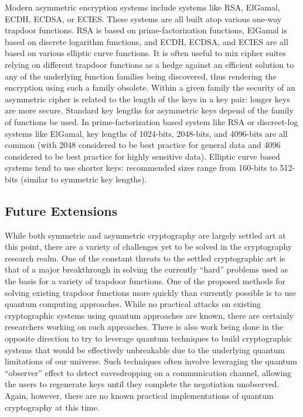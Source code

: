 \documentclass{sig-alternate}
\begin{document}
Modern asymmetric encryption systems include systems like RSA,
ElGamal, ECDH, ECDSA, or ECIES. These systems are all built atop
various one-way trapdoor functions. RSA is based on
prime-factorization functions, ElGamal is based on discrete logarithm
functions, and ECDH, ECDSA, and ECIES are all based on various
elliptic curve functions. It is often useful to mix cipher suites
relying on different trapdoor functions as a hedge against an
efficient solution to any of the underlying function families being
discovered, thus rendering the encryption using such a family
obsolete. Within a given family the security of an asymmetric cipher
is related to the length of the keys in a key pair: longer keys are
more secure. Standard key lengths for asymmetric keys depend of the
family of functions be used. In prime-factorization based system like
RSA or discreet-log systems like ElGamal, key lengths of 1024-bits,
2048-bits, and 4096-bits are all common (with 2048 considered to be
best practice for general data and 4096 considered to be best practice
for highly sensitive data). Elliptic curve based systems tend to use
shorter keys: recommended sizes range from 160-bits to 512-bits
(similar to symmetric key lengths).

\subsection{Future Extensions}

While both symmetric and asymmetric cryptography are largely settled
art at this point, there are a variety of challenges yet to be solved
in the cryptography research realm. One of the constant threats to the
settled cryptographic art is that of a major breakthrough in solving
the currently ``hard'' problems used as the basis for a variety of
trapdoor functions. One of the proposed methods for solving existing
trapdoor functions more quickly than currently possible is to use
quantum computing approaches. While no practical attacks on existing
cryptographic systems using quantum approaches are known, there are
certainly researchers working on such approaches. There is also work
being done in the opposite direction to try to leverage quantum
techniques to build cryptographic systems that would be effectively
unbreakable due to the underlying quantum limitations of our
universe. Such techniques often involve leveraging the quantum
``observer'' effect to detect eavesdropping on a communication
channel, allowing the users to regenerate keys until they complete the
negotiation unobserved. Again, however, there are no known practical
implementations of quantum cryptography at this time.
\end{document}
